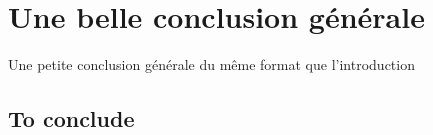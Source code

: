 \section*{Une belle conclusion
générale}\label{une-belle-conclusion-guxe9nuxe9rale}

Une petite conclusion générale du même format que l'introduction

\subsection*{To conclude}\label{to-conclude}
